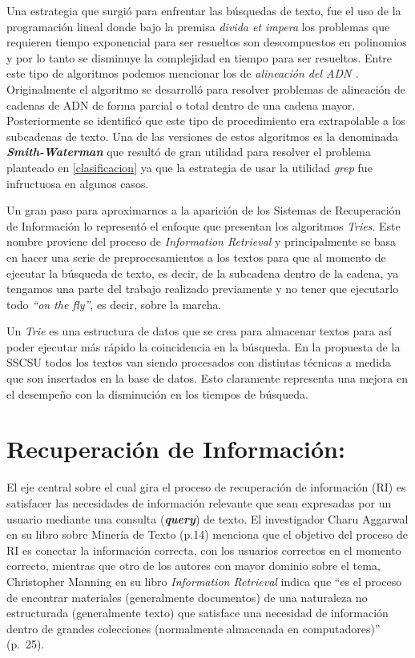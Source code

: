\documentclass[
  10,
  spanish,
  openany]{book}
\begin{document}
Una estrategia que surgió para enfrentar las búsquedas de texto, fue el uso de la programación lineal donde bajo la premisa \emph{divida et impera} los problemas que requieren tiempo exponencial para ser resueltos son descompuestos en polinomios y por lo tanto se disminuye la complejidad en tiempo para ser resueltos. Entre este tipo de algoritmos podemos mencionar los de \emph{alineación del ADN .} Originalmente el algoritmo se desarrolló para resolver problemas de alineación de cadenas de ADN de forma parcial o total dentro de una cadena mayor. Posteriormente se identificó que este tipo de procedimiento era extrapolable a los subcadenas de texto. Una de las versiones de estos algoritmos es la denominada \textbf{\emph{Smith-Waterman}} que resultó de gran utilidad para resolver el problema planteado en \ref{clasificacion} ya que la estrategia de usar la utilidad \emph{grep} fue infructuosa en algunos casos.

Un gran paso para aproximarnos a la aparición de los Sistemas de Recuperación de Información lo representó el enfoque que presentan los algoritmos \emph{Tries}. Este nombre proviene del proceso de \emph{Information Retrieval} y principalmente se basa en hacer una serie de preprocesamientos a los textos para que al momento de ejecutar la búsqueda de texto, es decir, de la subcadena dentro de la cadena, ya tengamos una parte del trabajo realizado previamente y no tener que ejecutarlo todo \emph{``on the fly''}, es decir, sobre la marcha.

Un \emph{Trie} \citep{fredkin1960} es una estructura de datos que se crea para almacenar textos para así poder ejecutar más rápido la coincidencia en la búsqueda. En la propuesta de la SSCSU todos los textos van siendo procesados con distintas técnicas a medida que son insertados en la base de datos. Esto claramente representa una mejora en el desempeño con la disminución en los tiempos de búsqueda.

\hypertarget{infret}{%
\section{Recuperación de Información:}\label{infret}}

El eje central sobre el cual gira el proceso de recuperación de información (RI) es satisfacer las necesidades de información relevante que sean expresadas por un usuario mediante una consulta (\textbf{\emph{query}}) de texto. El investigador Charu Aggarwal en su libro sobre Minería de Texto \citep{miningt2012} (p.14) menciona que el objetivo del proceso de RI es conectar la información correcta, con los usuarios correctos en el momento correcto, mientras que otro de los autores con mayor dominio sobre el tema, Christopher Manning en su libro \emph{Information Retrieval} indica que ``es el proceso de encontrar materiales (generalmente documentos) de una naturaleza no estructurada (generalmente texto) que satisface una necesidad de información dentro de grandes colecciones (normalmente almacenada en computadores)'' \citep{manning2008} (p.~25).
\end{document}
